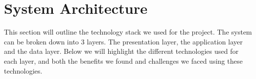 \section{System Architecture}
This section will outline the technology stack we used for the project. The system can be broken down into 3 layers. The presentation layer, the application layer and the data layer. Below we will highlight the different technologies used for each layer, and both the benefits we found and challenges we faced using these technologies.
